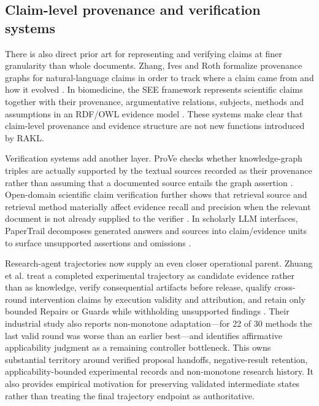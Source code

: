 \subsection{Claim-level provenance and verification systems}

There is also direct prior art for representing and verifying claims at finer granularity than whole documents. Zhang, Ives and Roth formalize provenance graphs for natural-language claims in order to track where a claim came from and how it evolved \cite{zhang2020claim}. In biomedicine, the SEE framework represents scientific claims together with their provenance, argumentative relations, subjects, methods and assumptions in an RDF/OWL evidence model \cite{boelling2014see}. These systems make clear that claim-level provenance and evidence structure are not new functions introduced by RAKL.

Verification systems add another layer. ProVe checks whether knowledge-graph triples are actually supported by the textual sources recorded as their provenance rather than assuming that a documented source entails the graph assertion \cite{amaral2024prove}. Open-domain scientific claim verification further shows that retrieval source and retrieval method materially affect evidence recall and precision when the relevant document is not already supplied to the verifier \cite{vladika2024}. In scholarly LLM interfaces, PaperTrail decomposes generated answers and sources into claim/evidence units to surface unsupported assertions and omissions \cite{martinboyle2026}.

Research-agent trajectories now supply an even closer operational parent. Zhuang et al. treat a completed experimental trajectory as candidate evidence rather than as knowledge, verify consequential artifacts before release, qualify cross-round intervention claims by execution validity and attribution, and retain only bounded Repairs or Guards while withholding unsupported findings \cite{zhuang2026trajectory}. Their industrial study also reports non-monotone adaptation---for 22 of 30 methods the last valid round was worse than an earlier best---and identifies affirmative applicability judgment as a remaining controller bottleneck. This owns substantial territory around verified proposal handoffs, negative-result retention, applicability-bounded experimental records and non-monotone research history. It also provides empirical motivation for preserving validated intermediate states rather than treating the final trajectory endpoint as authoritative.

